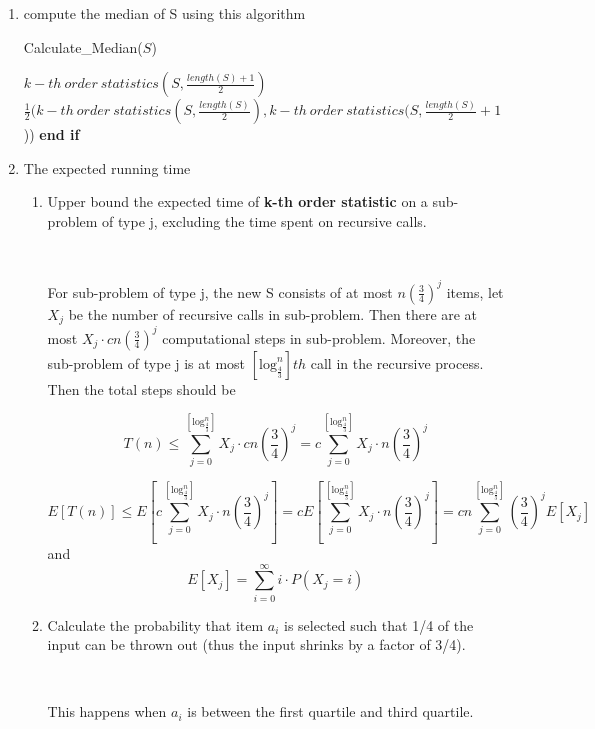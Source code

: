 \documentclass[11pt]{article}
\begin{document}
\begin{enumerate}
\begin{enumerate}
\item compute the median of S using this algorithm
\

	\begin{algorithm}[H]
    \caption{Calculate\_Median($S$)}	
    \begin{algorithmic}
     \State \Return $k-th \ order\  statistics(S,\frac{length(S)+1}{2})$
     \Else
     \State \Return $\frac{1}{2}(k-th \ order \ statistics(S,\frac{length(S)}{2}),k-th\  order  \ statistics(S,\frac{length(S)}{2}+1$))
     \EndIf
     \State \textbf{end if}
    \end{algorithmic}
    \end{algorithm}




\item The expected running time
\begin{enumerate}
\item Upper bound the expected time of \textbf{k-th order statistic} on a sub-problem of type j, excluding the time spent on recursive calls. 
\

\

For sub-problem of type j, the new S consists of at most $n(\frac{3}{4})^j$ items, let $X_j
$ be the number of recursive calls in sub-problem. Then there are at most $X_j \cdot c n(\frac{3}{4})^j$ computational steps in sub-problem. Moreover, the sub-problem of type j is at most $[\text{log}_\frac{4}{3}^n] th$ call in the recursive process. Then the total steps should be 

$$T(n)\leq \sum_{j=0}^{[\text{log}_\frac{4}{3}^n]} X_j \cdot c n(\frac{3}{4})^j = c \sum_{j=0}^{[\text{log}_\frac{4}{3}^n]} X_j \cdot  n(\frac{3}{4})^j$$

$$E[T(n)] \leq E[c \sum_{j=0}^{[\text{log}_\frac{4}{3}^n]} X_j \cdot  n(\frac{3}{4})^j]=cE[ \sum_{j=0}^{[\text{log}_\frac{4}{3}^n]} X_j \cdot  n(\frac{3}{4})^j]=c n\sum_{j=0}^{[\text{log}_\frac{4}{3}^n]} (\frac{3}{4})^j E[X_j]$$
and
$$E[X_j]=\sum_{i=0}^{\infty} i\cdot P(X_j=i)$$




\item Calculate the probability that item $a_i$ is selected such that 1/4 of the input can be thrown out (thus the input shrinks by a factor of 3/4).
\

\

This happens when $a_i$ is between the first quartile and third quartile.


\end{enumerate}
\end{enumerate}
\end{enumerate}
\end{document}
